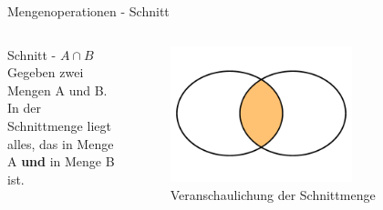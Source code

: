 %
%
%
%

\begin{frame}{Mengenoperationen - Schnitt}
    \begin{columns}
        \begin{alertblock}{Schnitt - $A\cap B$}
            Gegeben zwei Mengen A und B.\\
            In der Schnittmenge liegt alles, das in Menge A \textbf{und} in Menge B ist.
        \end{alertblock}
        \begin{figure}
            \centering
            \includegraphics[width=0.7\textwidth]{../figures/AundB.png}
            \caption{Veranschaulichung der Schnittmenge}
            \label{fig:my_label}
        \end{figure}
    \end{columns}
\end{frame}

